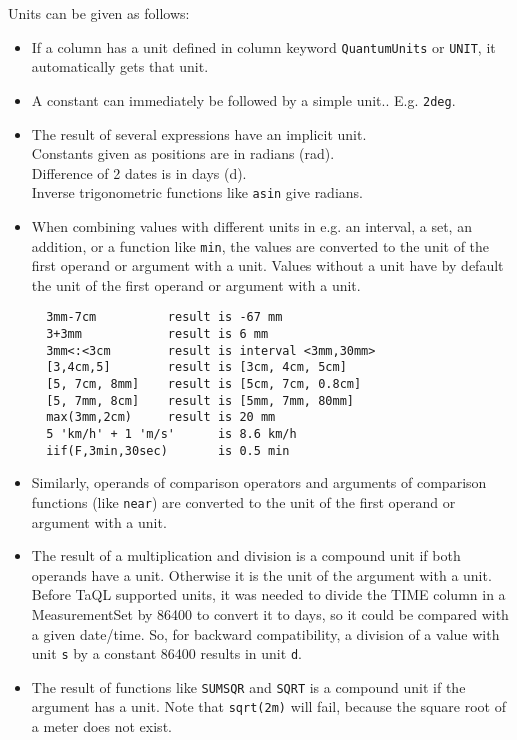 Units can be given as follows:
\begin{itemize}
 \item If a column has a unit defined in column keyword
	\texttt{QuantumUnits} or \texttt{UNIT}, it automatically
	gets that unit.
 \item A constant can immediately be followed by a simple unit..
	E.g. \texttt{2deg}.
 \item The result of several expressions have an implicit unit.
	\\Constants given as positions are in radians (rad).
	\\Difference of 2 dates is in days (d).
	\\Inverse trigonometric functions like \texttt{asin} give radians.
 \item When combining values with different units in e.g. an interval,
	a set, an addition, or a function like \texttt{min}, the values
	are converted to the unit of the first operand or argument
	with a unit. Values without a unit have by default the unit
	of the first operand or argument with a unit.
\begin{verbatim}
  3mm-7cm          result is -67 mm
  3+3mm            result is 6 mm
  3mm<:<3cm        result is interval <3mm,30mm>
  [3,4cm,5]        result is [3cm, 4cm, 5cm]
  [5, 7cm, 8mm]    result is [5cm, 7cm, 0.8cm]
  [5, 7mm, 8cm]    result is [5mm, 7mm, 80mm]
  max(3mm,2cm)     result is 20 mm
  5 'km/h' + 1 'm/s'      is 8.6 km/h
  iif(F,3min,30sec)       is 0.5 min
\end{verbatim}
 \item Similarly, operands of comparison operators and arguments of
	comparison functions (like \texttt{near}) are converted to
	the unit of the first operand or argument with a unit.
 \item The result of a multiplication and division is a compound unit
	if both operands have a unit. Otherwise it is the unit of
	the argument with a unit.
        \\Before TaQL supported units, it was needed to divide the
	TIME column in a MeasurementSet by 86400 to convert it to
	days, so it could be compared with a given date/time.
	So, for backward compatibility, a division of a value with
	unit \texttt{s} by a constant 86400 results in unit \texttt{d}.
 \item The result of functions like \texttt{SUMSQR} and \texttt{SQRT} is a
	compound unit if the argument has a unit.
	Note that \texttt{sqrt(2m)} will fail, because the square root
	of a meter does not exist.

\end{itemize}
